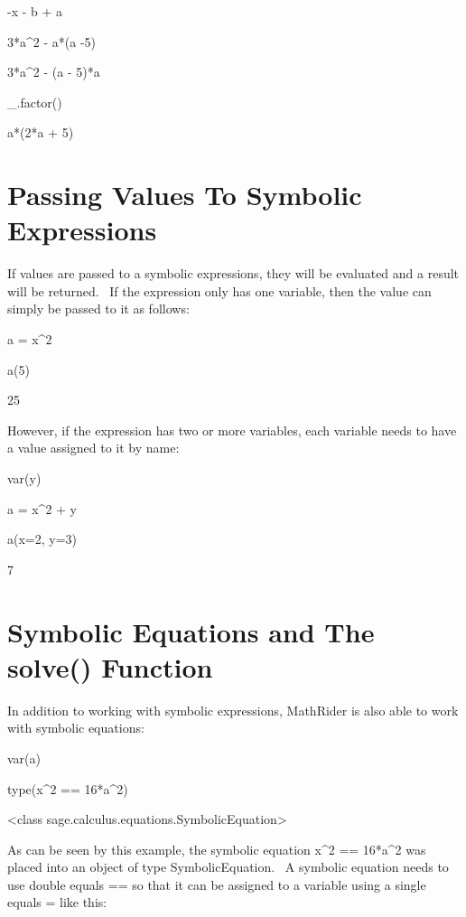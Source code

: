 \documentclass[12pt,twoside]{book}
\begin{document}
{\textbar}

{}-x {}- b + a

3*a\^{}2 {}- a*(a {}-5)

{\textbar}

3*a\^{}2 {}- (a {}- 5)*a

\_.factor()

{\textbar}

a*(2*a + 5)

\section[Passing Values To Symbolic Expressions]{Passing Values To Symbolic Expressions}

If values are passed to a symbolic expressions, they will be evaluated and a result will be returned. \ If the expression only has one variable, then the value can simply be passed to it as follows: 

\bigskip

a = x\^{}2

a(5)

{\textbar}

25

However, if the expression has two or more variables, each variable needs to have a value assigned to it by name: 

\bigskip

var({\textquotesingle}y{\textquotesingle})

a = x\^{}2 + y

a(x=2, y=3)

{\textbar}

7

\section[Symbolic Equations and The solve() Function]{Symbolic Equations and The solve() Function}

In addition to working with symbolic expressions, MathRider is also able to work with symbolic equations: 

\bigskip

var({\textquotesingle}a{\textquotesingle})

type(x\^{}2 == 16*a\^{}2)

{\textbar}

{\textless}class {\textquotesingle}sage.calculus.equations.SymbolicEquation{\textquotesingle}{\textgreater}

As can be seen by this example, the symbolic equation x\^{}2 == 16*a\^{}2 was placed into an object of type SymbolicEquation. \ A symbolic equation needs to use double equals {\textquotesingle}=={\textquotesingle} so that it can be assigned to a variable using a single equals {\textquotesingle}={\textquotesingle} like this: 
\end{document}
